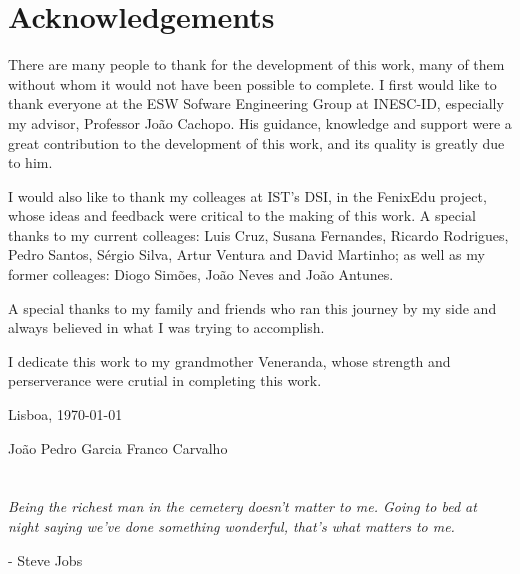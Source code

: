 \chapter*{Acknowledgements}
\thispagestyle{empty}

There are many people to thank for the development of this work, many
of them without whom it would not have been possible to complete. I
first would like to thank everyone at the ESW Sofware Engineering
Group at INESC-ID, especially my advisor, Professor João Cachopo. His
guidance, knowledge and support were a great contribution to the
development of this work, and its quality is greatly due to him.

I would also like to thank my colleages at IST's DSI, in the FenixEdu
project, whose ideas and feedback were critical to the making of this
work. A special thanks to my current colleages: Luis Cruz, Susana
Fernandes, Ricardo Rodrigues, Pedro Santos, Sérgio Silva, Artur
Ventura and David Martinho; as well as my former colleages: Diogo
Simões, João Neves and João Antunes.

A special thanks to my family and friends who ran this journey by my
side and always believed in what I was trying to accomplish.

I dedicate this work to my grandmother Veneranda, whose strength and
perserverance were crutial in completing this work.


\vfill
\begin{flushright}
  \begin{minipage}{8cm}
    \begin{center}
      Lisboa, \today

      Jo\~ao Pedro Garcia Franco Carvalho
    \end{center}
  \end{minipage}
\end{flushright}

\newpage
\thispagestyle{empty}

\cleardoublepage


\chapter*{}
\thispagestyle{empty}

\vfill
\mbox{}
\vfill\large
\begin{flushright}
  \begin{minipage}{8cm}
    \begin{center}
      {\it Being the richest man in the cemetery doesn't matter to me. Going to bed at night saying we've done something wonderful, that's what matters to me.}
    \end{center}
    \begin{flushright}
      - Steve Jobs
    \end{flushright}
  \end{minipage}
\end{flushright}
\normalsize\vfill
\newpage
\thispagestyle{empty}

